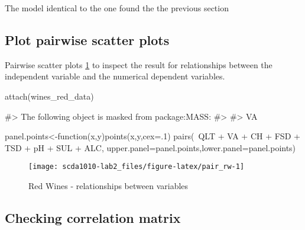 The model identical to the one found the the previous section

\hypertarget{plot-pairwise-scatter-plots}{%
\subsection{Plot pairwise scatter
plots}\label{plot-pairwise-scatter-plots}}

Pairwise scatter plots \ref{fig:pair_rw} to inspect the result for
relationships between the independent variable and the numerical
dependent variables.

\begin{Schunk}
\begin{Sinput}
attach(wines_red_data)
\end{Sinput}
\begin{Soutput}
#> The following object is masked from package:MASS:
#> 
#>     VA
\end{Soutput}
\begin{Sinput}
panel.points<-function(x,y){points(x,y,cex=.1)}
pairs(~QLT + VA + CH + FSD + TSD + pH + SUL + ALC,
      upper.panel=panel.points,lower.panel=panel.points)
\end{Sinput}
\begin{figure}

{\centering \texttt{[image: scda1010-lab2\_files/figure-latex/pair\_rw-1]} 

}

\caption[Red Wines - relationships between variables]{Red Wines - relationships between variables}\label{fig:pair_rw}
\end{figure}
\end{Schunk}

\hypertarget{checking-correlation-matrix}{%
\subsection{Checking correlation
matrix}\label{checking-correlation-matrix}}

